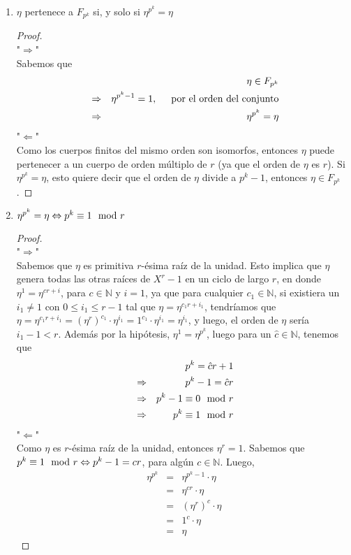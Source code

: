 	\begin{enumerate}
		\item $\eta$ pertenece a $F_{p^k}$ si, y solo si $\eta^{p^k}=\eta$
		\begin{proof}
			\text{ }\\
			"$\Rightarrow$"\\
			Sabemos que 
			\begin{eqnarray}
				& &\eta \in F_{p^k}\nonumber\\
				&\Rightarrow &\eta^{p^k-1} = 1, \hspace{0.5cm} \text{por el orden del conjunto}\nonumber\\
				&\Rightarrow &\eta^{p^k}=\eta
			\end{eqnarray}
			"$\Leftarrow$"\\
			Como los cuerpos finitos del mismo orden son isomorfos, entonces $\eta$ puede pertenecer a un cuerpo de orden múltiplo de $r$ (ya que el orden de $\eta$ es $r$). Si $\eta^{p^k}=\eta$, esto quiere decir que el orden de $\eta$ divide a $p^k-1$, entonces $\eta \in F_{p^k}$. 
		\end{proof}
		
		\item $\eta^{p^k}=\eta\Leftrightarrow p^k\equiv 1 \mod r$
		\begin{proof}
			\text{ }\\
			"$\Rightarrow$"\\
			Sabemos que $\eta$ es primitiva $r$-ésima raí­z de la unidad. Esto implica que $\eta$ genera todas las otras raí­ces de $X^r-1$ en un ciclo de largo $r$, en donde $\eta^1=\eta^{cr+i}$, para $c\in \mathbb{N}$ y $i=1$, ya que para cualquier $c_1\in \mathbb{N}$, si existiera un  $i_1\neq 1$ con $0\leq i_1\leq r-1$ tal que $\eta=\eta^{c_1r+i_1}$, tendrí­amos que $\eta = \eta^{c_1r+i_1} =(\eta^{r})^{c_1}\cdot\eta^{i_1}=1^{c_1}\cdot\eta^{i_1}=\eta^{i_1}$, y luego, el orden de $\eta$ serí­a $i_1-1<r$. Además por la hipótesis, $\eta^1=\eta^{p^k}$, luego para un $\hat c\in \mathbb{N}$, tenemos que 
			\begin{eqnarray}
				& &p^k=\hat c r+1\nonumber\\
				&\Rightarrow &p^k-1 = \hat c r\nonumber\\
				&\Rightarrow &p^k-1\equiv 0\mod r\nonumber\\
				&\Rightarrow &p^k\equiv 1\mod r\nonumber
			\end{eqnarray}	
			"$\Leftarrow$"\\
			Como $\eta$ es $r$-ésima raí­z de la unidad, entonces $\eta^r = 1$. Sabemos que $p^k\equiv 1 \mod r \Leftrightarrow p^k-1 = cr$, para algún $c\in\mathbb{N}$. Luego,
			\begin{eqnarray}
				\eta^{p^k}&=& \eta^{p^k-1}\cdot\eta\nonumber\\
				&=&\eta^{cr}\cdot\eta\nonumber\\
				&=&(\eta^r)^c\cdot \eta \nonumber\\
				&=& 1^c\cdot\eta \nonumber\\
				&=& \eta\nonumber
			\end{eqnarray}			 					
		\end{proof}
	\end{enumerate}
